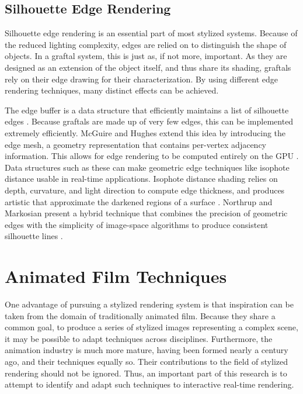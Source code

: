 \documentclass[notitlepage]{report}
\begin{document}
\subsection{Silhouette Edge Rendering}
Silhouette edge rendering is an essential part of most stylized systems. Because of the reduced lighting complexity, edges are relied on to distinguish the shape of objects. In a graftal system, this is just as, if not more, important. As they are designed as an extension of the object itself, and thus share its shading, graftals rely on their edge drawing for their characterization. By using different edge rendering techniques, many distinct effects can be achieved. 

The edge buffer is a data structure that efficiently maintains a list of silhouette edges \cite{Buchanan2000}. Because graftals are made up of very few edges, this can be implemented extremely efficiently. McGuire and Hughes extend this idea by introducing the edge mesh, a geometry representation that contains per-vertex adjacency information. This allows for edge rendering to be computed entirely on the GPU \cite{McGuire2004}. Data structures such as these can make geometric edge techniques like isophote distance usable in real-time applications. Isophote distance shading relies on depth, curvature, and light direction to compute edge thickness, and produces artistic that approximate the darkened regions of a surface \cite{Goodwin2007}. Northrup and Markosian present a hybrid technique that combines the precision of geometric edges with the simplicity of image-space algorithms to produce consistent silhouette lines \cite{Northrup2000}. 


\section{Animated Film Techniques}

One advantage of pursuing a stylized rendering system is that inspiration can be taken from the domain of traditionally animated film. Because they share a common goal, to produce a series of stylized images representing a complex scene, it may be possible to adapt techniques across disciplines. Furthermore, the animation industry is much more mature, having been formed nearly a century ago, and their techniques equally so. Their contributions to the field of stylized rendering should not be ignored. Thus, an important part of this research is to attempt to identify and adapt such techniques to interactive real-time rendering.
\end{document}
